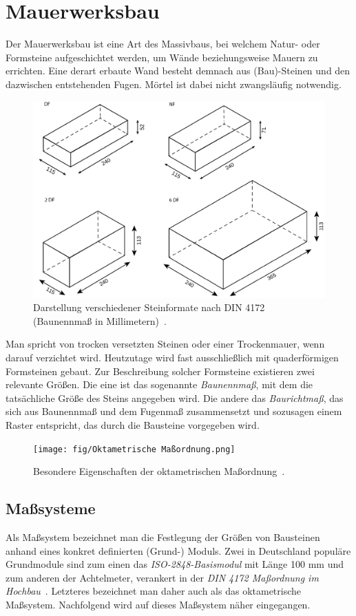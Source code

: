 \section{Mauerwerksbau}\label{basics:Mauerwerksbau}
Der Mauerwerksbau ist eine Art des Massivbaus, bei welchem Natur- oder Formsteine aufgeschichtet werden, um Wände beziehungsweise Mauern zu errichten.
Eine derart erbaute Wand besteht demnach aus (Bau)-Steinen und den dazwischen entstehenden Fugen.
Mörtel ist dabei nicht zwangsläufig notwendig.
\begin{figure}[hb]
  \centering
  \includegraphics[width=0.7\columnwidth]{fig/Ziegelsteinformate DF NF 2DF 6DF.png}
  \caption{Darstellung verschiedener Steinformate nach DIN 4172 (Baunennmaß in Millimetern)~\cite{Steinfor38:online}.}\label{fig:basics:Steinformate}
\end{figure}
Man spricht von trocken versetzten Steinen oder einer Trockenmauer, wenn darauf verzichtet wird.
Heutzutage wird fast ausschließlich mit quaderförmigen Formsteinen gebaut.
Zur Beschreibung solcher Formsteine existieren zwei relevante Größen.
Die eine ist das sogenannte \textit{Baunennmaß}, mit dem die tatsächliche Größe des Steins angegeben wird.
Die andere das \textit{Baurichtmaß}, das sich aus Baunennmaß und dem Fugenmaß zusammensetzt und sozusagen einem Raster entspricht, das durch die Bausteine vorgegeben wird.
\begin{figure}[ht]
  \centering
  \texttt{[image: fig/Oktametrische Maßordnung.png]}
  \caption{Besondere Eigenschaften der oktametrischen Maßordnung~\cite{Moro2021}.}\label{fig:basics:OktametrischeMassordnung}
\end{figure}

\subsection{Maßsysteme}\label{basics:masssysteme}
Als Maßsystem bezeichnet man die Festlegung der Größen von Bausteinen anhand eines konkret definierten (Grund-) Moduls.
Zwei in Deutschland populäre Grundmodule sind zum einen das \textit{ISO-2848-Basismodul} mit Länge 100 mm und zum anderen der Achtelmeter, verankert in der \textit{DIN 4172 Maßordnung im Hochbau}~\cite{ISO2848}\cite{DIN417224}.
Letzteres bezeichnet man daher auch als das oktametrische Maßsystem.
Nachfolgend wird auf dieses Maßsystem näher eingegangen.

